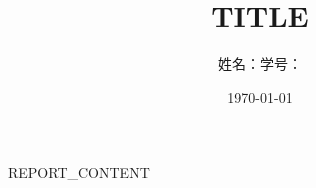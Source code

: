 \documentclass[12pt,a4paper]{ctexart}
\title{{{TITLE}}}
\author{姓名：\underline{\hspace{4cm}}\quad 学号：\underline{\hspace{4cm}}}
\date{\today}
\begin{document}
\maketitle
{{REPORT_CONTENT}}
\end{document}
